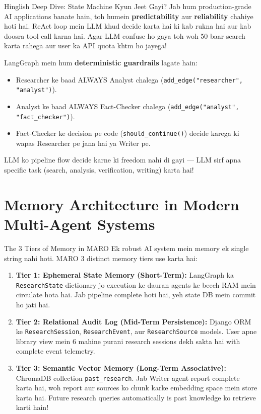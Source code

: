 \documentclass[11pt,a4paper,twoside]{report}
\begin{document}
\begin{hindibox}{Hinglish Deep Dive: State Machine Kyun Jeet Gayi?}
Jab hum production-grade AI applications banate hain, toh humein \textbf{predictability} aur \textbf{reliability} chahiye hoti hai. ReAct loop mein LLM khud decide karta hai ki kab rukna hai aur kab doosra tool call karna hai. Agar LLM confuse ho gaya toh woh 50 baar search karta rahega aur user ka API quota khtm ho jayega!

LangGraph mein hum \textbf{deterministic guardrails} lagate hain:
\begin{itemize}
    \item Researcher ke baad ALWAYS Analyst chalega (\texttt{add\_edge("researcher", "analyst")}).
    \item Analyst ke baad ALWAYS Fact-Checker chalega (\texttt{add\_edge("analyst", "fact\_checker")}).
    \item Fact-Checker ke decision pe code (\texttt{should\_continue()}) decide karega ki wapas Researcher pe jana hai ya Writer pe.
\end{itemize}
LLM ko pipeline flow decide karne ki freedom nahi di gayi --- LLM sirf apna specific task (search, analysis, verification, writing) karta hai!
\end{hindibox}

\section{Memory Architecture in Modern Multi-Agent Systems}

\begin{conceptbox}{The 3 Tiers of Memory in MARO}
Ek robust AI system mein memory ek single string nahi hoti. MARO 3 distinct memory tiers use karta hai:

\begin{enumerate}
    \item \textbf{Tier 1: Ephemeral State Memory (Short-Term):}
    LangGraph ka \texttt{ResearchState} dictionary jo execution ke dauran agents ke beech RAM mein circulate hota hai. Jab pipeline complete hoti hai, yeh state DB mein commit ho jati hai.
    \item \textbf{Tier 2: Relational Audit Log (Mid-Term Persistence):}
    Django ORM ke \texttt{ResearchSession}, \texttt{ResearchEvent}, aur \texttt{ResearchSource} models. User apne library view mein 6 mahine purani research sessions dekh sakta hai with complete event telemetry.
    \item \textbf{Tier 3: Semantic Vector Memory (Long-Term Associative):}
    ChromaDB collection \texttt{past\_research}. Jab Writer agent report complete karta hai, woh report aur sources ko chunk karke embedding space mein store karta hai. Future research queries automatically is past knowledge ko retrieve karti hain!
\end{enumerate}
\end{conceptbox}
\end{document}
